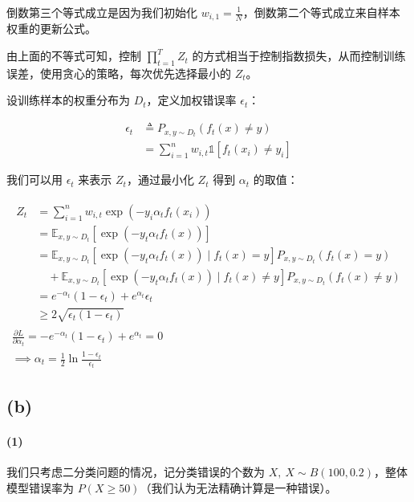\documentclass{ctexart}
\begin{document}
倒数第三个等式成立是因为我们初始化
\(w_{i,1}=\frac{1}{N}\)，倒数第二个等式成立来自样本权重的更新公式。

由上面的不等式可知，控制 \(\prod_{t=1}^TZ_t\)
的方式相当于控制指数损失，从而控制训练误差，使用贪心的策略，每次优先选择最小的
\(Z_t\)。

设训练样本的权重分布为 \(D_t\)，定义加权错误率 \(\epsilon_t\)：


\begin{equation*}
\begin{aligned}
\epsilon_t&\triangleq P_{x,y\sim D_t}(f_t(x)\ne y)\\
&=\sum_{i=1}^nw_{i,t}\mathbb 1[f_t(x_i)\ne y_i]
\end{aligned}
\end{equation*}


我们可以用 \(\epsilon_t\) 来表示 \(Z_t\)，通过最小化 \(Z_t\) 得到
\(\alpha_t\) 的取值：


\begin{gather*}
\begin{aligned}
Z_t &= \sum_{i=1}^nw_{i,t}\exp\left(-y_i\alpha_tf_t(x_i)\right)\\
&= \mathbb E_{x,y\sim D_t}\left[\exp(-y_t\alpha_t f_t(x))\right] \\
&=\mathbb E_{x,y\sim D_t}\left[\exp(-y_t\alpha_t f_t(x))\mid f_t(x)=y\right]P_{x,y\sim D_t}(f_t(x)=y)\\
&\quad+\mathbb E_{x,y\sim D_t}\left[\exp(-y_t\alpha_t f_t(x))\mid f_t(x)\ne y\right]P_{x,y\sim D_t}(f_t(x)\ne y)\\
&= e^{-\alpha_t}(1-\epsilon_t)+e^{\alpha_t}\epsilon_t\\
&\ge 2\sqrt{\epsilon_t(1-\epsilon_t)}
\end{aligned}\\
\frac{\partial L}{\partial \alpha_t} = -e^{-\alpha_t}(1-\epsilon_t)+e^{\alpha_t}=0\\
\implies \alpha_t =\frac{1}{2}\ln\frac{1-\epsilon_t}{\epsilon_t}
\end{gather*}


\subsection{(b)}\label{b-2}

\paragraph{(1)}\label{section-16}

我们只考虑二分类问题的情况，记分类错误的个数为
\(X,~X\sim B(100, 0.2)\)，整体模型错误率为
\(P(X\ge 50)\)（我们认为无法精确计算是一种错误）。
\end{document}
